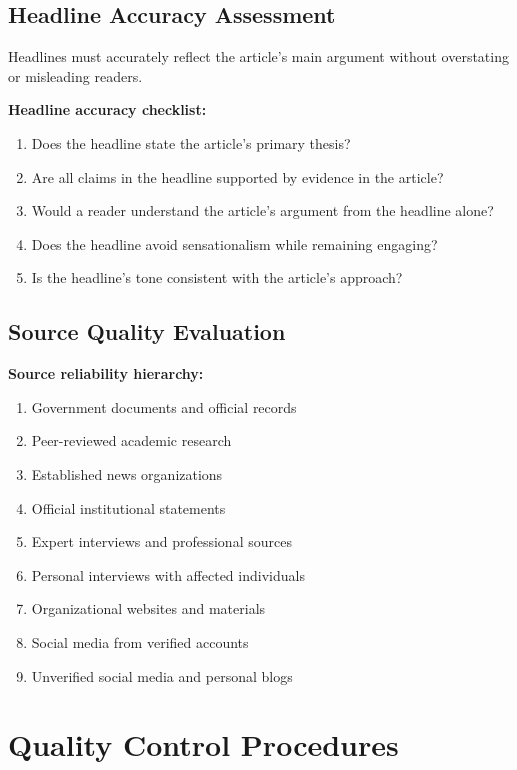 \documentclass[12pt]{article}
\begin{document}
\newpage
\subsection{Headline Accuracy Assessment}
\label{sec:headline-accuracy}

Headlines must accurately reflect the article's main argument without overstating or misleading readers.

\noindent
\textbf{Headline accuracy checklist:}
\begin{enumerate}
    \item Does the headline state the article's primary thesis?
    \item Are all claims in the headline supported by evidence in the article?
    \item Would a reader understand the article's argument from the headline alone?
    \item Does the headline avoid sensationalism while remaining engaging?
    \item Is the headline's tone consistent with the article's approach?
\end{enumerate}

\subsection{Source Quality Evaluation}

\textbf{Source reliability hierarchy:}
\begin{enumerate}
    \item Government documents and official records
    \item Peer-reviewed academic research
    \item Established news organizations
    \item Official institutional statements
    \item Expert interviews and professional sources
    \item Personal interviews with affected individuals
    \item Organizational websites and materials
    \item Social media from verified accounts
    \item Unverified social media and personal blogs
\end{enumerate}

\newpage

\section{Quality Control Procedures}
\label{sec:quality-control}
\end{document}
